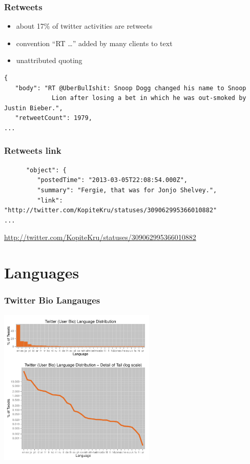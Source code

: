 \documentclass{beamer}
\begin{document}
\begin{frame}[fragile]\frametitle{Retweets}
\begin{itemize}
\item about 17\% of twitter activities are retweets
\item convention ``RT \ldots'' added by many clients to text
\item unattributed quoting
\end{itemize}
\begin{verbatim}
{
   "body": "RT @UberBulIshit: Snoop Dogg changed his name to Snoop 
             Lion after losing a bet in which he was out-smoked by Justin Bieber.", 
   "retweetCount": 1979, 
...
\end{verbatim}
\end{frame}


\begin{frame}[fragile]\frametitle{Retweets link}
\begin{verbatim}
      "object": {
         "postedTime": "2013-03-05T22:08:54.000Z", 
         "summary": "Fergie, that was for Jonjo Shelvey.", 
         "link": "http://twitter.com/KopiteKru/statuses/309062995366010882"
...
\end{verbatim}
\href{http://twitter.com/KopiteKru/statuses/309062995366010882}{http://twitter.com/KopiteKru/statuses/309062995366010882}
\end{frame}         
         
\section{Languages}


\begin{frame}\frametitle{Twitter Bio Langauges}
  \begin{center}
    \includegraphics[width=7.5cm]{./imgs/distro_bio.pdf}
  \end{center}
\end{frame}
\end{document}
